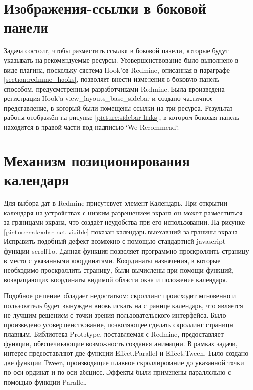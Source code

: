 \section{Изображения-ссылки в боковой панели}
Задача состоит, чтобы разместить ссылки в боковой панели, которые будут
указывать на рекомендуемые ресурсы. Усовершенствование было выполнено в виде
плагина, поскольку система Hook'ов Redmine, описанная в параграфе
\ref{section:redmine_hooks}, позволяет внести изменения в боковую панель
способом, предусмотренным разработчиками Redmine. Была произведена регистрация
Hook'a view\_layouts\_base\_sidebar и создано частичное представление, в
который были помещены ссылки на три ресурса. Результат работы отображён на
рисунке \ref{picture:sidebar-links}, в котором боковая панель находится в
правой части под надписью `We Recommend`.


\section{Механизм позиционирования календаря}
Для выбора дат в Redmine присутсвует элемент Календарь. При открытии календаря
на устройствах с низким разрешением экрана он может разместиться за границами
экрана, что создаёт неудобства при его использовании. На рисунке
\ref{picture:calendar-not-visible} показан календарь выехавший за границы
экрана. Исправить подобный дефект возможно с помощью стандартной javascript
функции scrollTo. Данная функция позволяет программно проскроллить страницу в
место с указанными координатами. Координаты назначения, в которые необходимо
проскроллить страницу, были вычислены при помощи функций, возвращающих
координаты видимой области окна и положение календаря.

Подобное решение обладает недостатком: скроллинг происходит мгновенно и
пользователь будет вынужден вновь искать на странице календарь, что является не
лучшим решением с точки зрения пользовательского интерфейса. Было произведено
усовершенствование, позволяющее сделать скроллинг страницы плавным.
Библиотека Prototype, поставляемая с Redmine, предоставляет функции,
обеспечивающие возможность создания анимации. В рамках задачи, интерес
предоставляют две функции Effect.Parallel и Effect.Tween. Было создано две
функции Tween, производящие плавное скроллирование до указанной точки по оси
ординат и по оси абсцисс. Эффекты были применены параллельно с помощью функции
Parallel.

